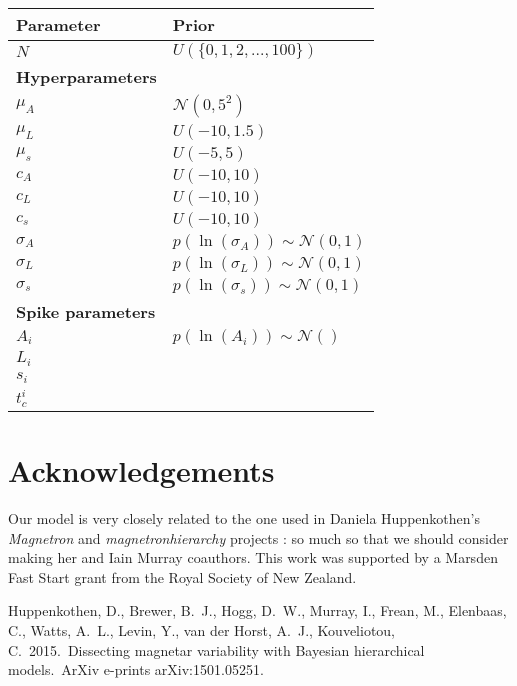 \documentclass[a4paper, 11pt]{article}
\begin{document}
\begin{table}[!ht]
\begin{center}
\begin{tabular}{|l|l|}
\hline
Parameter			&		Prior\\
\hline
$N$					&		$U(\{0, 1, 2, ..., 100\})$\\
\hline
{\bf Hyperparameters}	&	\\
\hline
$\mu_A$				&		$\mathcal{N}(0, 5^2)$\\
$\mu_L$				&		$U(-10, 1.5)$\\
$\mu_s$				&		$U(-5, 5)$\\
$c_A$				&		$U(-10, 10)$\\
$c_L$				&		$U(-10, 10)$\\
$c_s$				&		$U(-10, 10)$\\
$\sigma_A$			&		$p\left(\ln(\sigma_A)\right) \sim \mathcal{N}(0, 1)$\\
$\sigma_L$			&		$p\left(\ln(\sigma_L)\right) \sim \mathcal{N}(0, 1)$\\
$\sigma_s$			&		$p\left(\ln(\sigma_s)\right) \sim \mathcal{N}(0, 1)$\\
\hline
{\bf Spike parameters}	&	\\
\hline
$A_i$				&	$p(\ln(A_i))\sim\mathcal{N}\left(\right)$\\
$L_i$				&		\\
$s_i$				&	\\
$t_c^i$				&	\\
\end{tabular}
\end{center}
\end{table}

\section*{Acknowledgements}
Our model is very closely related to the one used in Daniela Huppenkothen's
{\it Magnetron} and {\it magnetronhierarchy} projects \citep{magnetron}: so
much so that we should consider making her and Iain Murray coauthors.
This work was supported by a Marsden Fast Start grant from the Royal Society of
New Zealand.

\begin{thebibliography}{}
 Huppenkothen, D., 
Brewer, B.~J., Hogg, D.~W., Murray, I., Frean, M., Elenbaas, C., Watts, 
A.~L., Levin, Y., van der Horst, A.~J., Kouveliotou, C.\ 2015.\ Dissecting 
magnetar variability with Bayesian hierarchical models.\ ArXiv e-prints 
arXiv:1501.05251.
\end{thebibliography}
\end{document}
